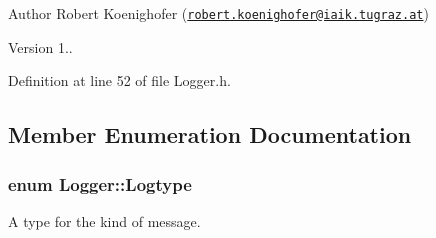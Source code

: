\begin{DoxyAuthor}{Author}
Robert Koenighofer (\href{mailto:robert.koenighofer@iaik.tugraz.at}{\tt robert.\-koenighofer@iaik.\-tugraz.\-at}) 
\end{DoxyAuthor}
\begin{DoxyVersion}{Version}
1.. 
\end{DoxyVersion}


Definition at line 52 of file Logger.\-h.



\subsection{Member Enumeration Documentation}
\hypertarget{classLogger_ac9e601f90bf326ce2088de52018861dc}{
\subsubsection[{Logtype}]{\setlength{\rightskip}{0pt plus 5cm}enum {\bf Logger\-::\-Logtype}}}\label{classLogger_ac9e601f90bf326ce2088de52018861dc}


A type for the kind of message. 

